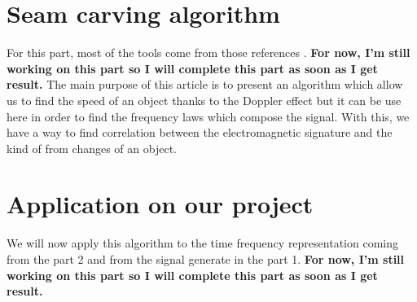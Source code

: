 


\chapter{Seam carving algorithm}

For this part, most of the tools come from those references \cite{Doopler1} \cite{Doopler2} \cite{Doopler3}.
\textbf{For now, I'm still working on this part so I will complete this part as soon as I get result.}
The main purpose of this article is to present an algorithm which allow us to find the speed of an object thanks to the Doppler effect but it can be use here in order to find the frequency laws which compose the signal. With this, we have a way to find correlation between the electromagnetic signature and the kind of from changes of an object.


\chapter{Application on our project}

We will now apply this algorithm to the time frequency representation coming from the part 2 and from the signal generate in the part 1.
\textbf{For now, I'm still working on this part so I will complete this part as soon as I get result.}